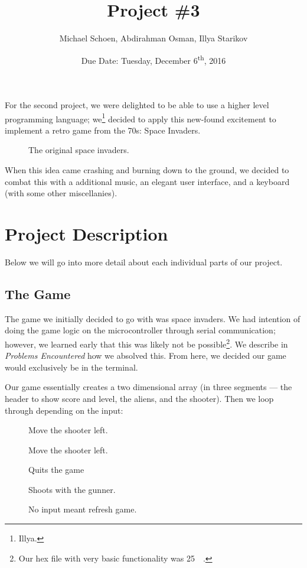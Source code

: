 \documentclass[12pt]{article}
\title{Project \#3}
\date{Due Date: Tuesday, December 6\textsuperscript{th}, 2016}
\author{Michael Schoen, Abdirahman Osman, Illya Starikov}
\begin{document}
\maketitle

For the second project, we were delighted to be able to use a higher level programming language; we\footnote{Illya.} decided to apply this new-found excitement to implement a retro game from the \num{70}s: Space Invaders.

\begin{figure}[!ht]
    \caption{The original space invaders.}
    \label{space-invaders}
\end{figure}

When this idea came crashing and burning down to the ground, we decided to combat this with a additional music, an elegant user interface, and a keyboard (with some other miscellanies).

\section{Project Description}
Below we will go into more detail about each individual parts of our project.

\subsection{The Game}
The game we initially decided to go with was space invaders. We had intention of doing the game logic on the microcontroller through serial communication; however, we learned early that this was likely not be possible\footnote{Our hex file with very basic functionality was \SI{25}{\kilo\byte}.}. We describe in \textit{Problems Encountered} how we absolved this. From here, we decided our game would exclusively be in the terminal.

Our game essentially creates a two dimensional array (in three segments --- the header to show score and level, the aliens, and the shooter). Then we loop through depending on the input:

\begin{description}
    \item[\keys{\arrowkeyleft}] Move the shooter left.
    \item[\keys{\arrowkeyright}] Move the shooter left.
    \item[] Quits the game
    \item[\keys{\SPACE}] Shoots with the gunner.
    \item[\keys{ }] No input meant refresh game.
\end{description}
\end{document}

